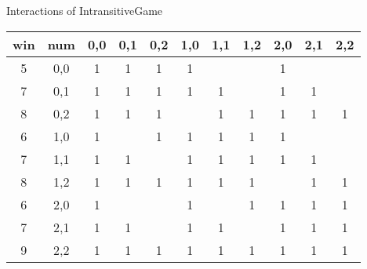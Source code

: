 Interactions of IntransitiveGame
\begin{tabular}{ccccccccccc}
\hline
  win  &  num  &  0,0  &  0,1  &  0,2  &  1,0  &  1,1  &  1,2  &  2,0  &  2,1  &  2,2  \\
\hline
   5   &  0,0  &   1   &   1   &   1   &   1   &       &       &   1   &       &       \\
   7   &  0,1  &   1   &   1   &   1   &   1   &   1   &       &   1   &   1   &       \\
   8   &  0,2  &   1   &   1   &   1   &       &   1   &   1   &   1   &   1   &   1   \\
   6   &  1,0  &   1   &       &   1   &   1   &   1   &   1   &   1   &       &       \\
   7   &  1,1  &   1   &   1   &       &   1   &   1   &   1   &   1   &   1   &       \\
   8   &  1,2  &   1   &   1   &   1   &   1   &   1   &   1   &       &   1   &   1   \\
   6   &  2,0  &   1   &       &       &   1   &       &   1   &   1   &   1   &   1   \\
   7   &  2,1  &   1   &   1   &       &   1   &   1   &       &   1   &   1   &   1   \\
   9   &  2,2  &   1   &   1   &   1   &   1   &   1   &   1   &   1   &   1   &   1   \\
\hline
\end{tabular}


